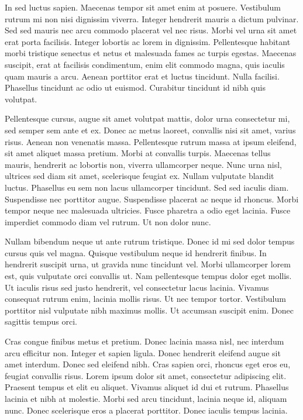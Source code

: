 \documentclass[a4paper,10pt,twoside]{article} %
\begin{document}
In sed luctus sapien.
Maecenas tempor sit amet enim at posuere.
Vestibulum rutrum mi non nisi dignissim viverra.
Integer hendrerit mauris a dictum pulvinar.
Sed sed mauris nec arcu commodo placerat vel nec risus.
Morbi vel urna sit amet erat porta facilisis.
Integer lobortis ac lorem in dignissim.
Pellentesque habitant morbi tristique senectus et netus et malesuada fames ac turpis egestas.
Maecenas suscipit, erat at facilisis condimentum, enim elit commodo magna, quis iaculis quam mauris a arcu.
Aenean porttitor erat et luctus tincidunt.
Nulla facilisi.
Phasellus tincidunt ac odio ut euismod.
Curabitur tincidunt id nibh quis volutpat.

Pellentesque cursus, augue sit amet volutpat mattis, dolor urna consectetur mi, sed semper sem ante et ex.
Donec ac metus laoreet, convallis nisi sit amet, varius risus.
Aenean non venenatis massa.
Pellentesque rutrum massa at ipsum eleifend, sit amet aliquet massa pretium.
Morbi at convallis turpis.
Maecenas tellus mauris, hendrerit ac lobortis non, viverra ullamcorper neque.
Nunc urna nisl, ultrices sed diam sit amet, scelerisque feugiat ex.
Nullam vulputate blandit luctus.
Phasellus eu sem non lacus ullamcorper tincidunt.
Sed sed iaculis diam.
Suspendisse nec porttitor augue.
Suspendisse placerat ac neque id rhoncus.
Morbi tempor neque nec malesuada ultricies.
Fusce pharetra a odio eget lacinia.
Fusce imperdiet commodo diam vel rutrum.
Ut non dolor nunc.

Nullam bibendum neque ut ante rutrum tristique.
Donec id mi sed dolor tempus cursus quis vel magna.
Quisque vestibulum neque id hendrerit finibus.
In hendrerit suscipit urna, ut gravida nunc tincidunt vel.
Morbi ullamcorper lorem est, quis vulputate orci convallis ut.
Nam pellentesque tempus dolor eget mollis.
Ut iaculis risus sed justo hendrerit, vel consectetur lacus lacinia.
Vivamus consequat rutrum enim, lacinia mollis risus.
Ut nec tempor tortor.
Vestibulum porttitor nisl vulputate nibh maximus mollis.
Ut accumsan suscipit enim.
Donec sagittis tempus orci.

Cras congue finibus metus et pretium.
Donec lacinia massa nisl, nec interdum arcu efficitur non.
Integer et sapien ligula.
Donec hendrerit eleifend augue sit amet interdum.
Donec sed eleifend nibh.
Cras sapien orci, rhoncus eget eros eu, feugiat convallis risus.
Lorem ipsum dolor sit amet, consectetur adipiscing elit.
Praesent tempus et elit eu aliquet.
Vivamus aliquet id dui et rutrum.
Phasellus lacinia et nibh at molestie.
Morbi sed arcu tincidunt, lacinia neque id, aliquam nunc.
Donec scelerisque eros a placerat porttitor.
Donec iaculis tempus lacinia.
\end{document}
